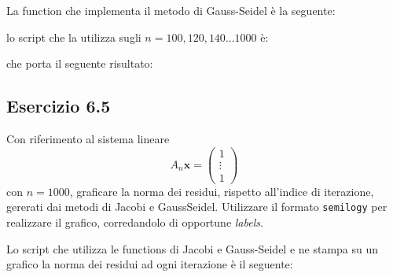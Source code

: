 La function che implementa il metodo di Gauss-Seidel è la seguente:

lo script che la utilizza sugli $n = 100, 120, 140 ... 1000$ è:

che porta il seguente risultato:



	\subsection{Esercizio 6.5}
Con riferimento al sistema lineare
\begin{equation*}
	A_n \mathbf{x} = \begin{pmatrix} 1 \\ \vdots \\ 1 \end{pmatrix}
\end{equation*}
con $n = 1000$, graficare la norma dei residui, rispetto all’indice di iterazione, gererati dai metodi di Jacobi e GaussSeidel.
Utilizzare il formato \lstinline{semilogy} per realizzare il grafico, corredandolo di opportune \textit{labels}.

Lo script che utilizza le functions di Jacobi e Gauss-Seidel e ne stampa su un grafico la norma dei residui ad ogni iterazione è il seguente:
